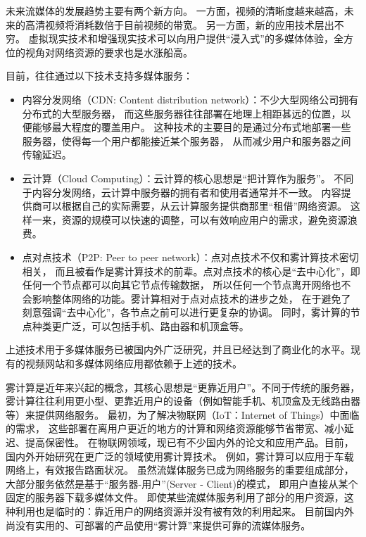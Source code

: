 未来流媒体的发展趋势主要有两个新方向。
一方面，视频的清晰度越来越高，未来的高清视频将消耗数倍于目前视频的带宽。
另一方面，新的应用技术层出不穷。
虚拟现实技术和增强现实技术可以向用户提供“浸入式”的多媒体体验，全方位的视角对网络资源的要求也是水涨船高。

目前，往往通过以下技术支持多媒体服务：
\begin{itemize}
\item 内容分发网络（CDN: Content distribution network）：不少大型网络公司拥有分布式的大型服务器，
而这些服务器往往部署在地理上相距甚远的位置，以便能够最大程度的覆盖用户。
这种技术的主要目的是通过分布式地部署一些服务器，使得每一个用户都能接近某个服务器，
从而减少用户和服务器之间传输延迟。

\item 云计算（Cloud Computing）：云计算的核心思想是“把计算作为服务”。
不同于内容分发网络，云计算中服务器的拥有者和使用者通常并不一致。
内容提供商可以根据自己的实际需要，从云计算服务提供商那里“租借”网络资源。
这样一来，资源的规模可以快速的调整，可以有效响应用户的需求，避免资源浪费。

\item 点对点技术（P2P: Peer to peer network）：点对点技术不仅和雾计算技术密切相关，
而且被看作是雾计算技术的前辈。点对点技术的核心是“去中心化”，即任何一个节点都可以向其它节点传输数据，
所以任何一个节点离开网络也不会影响整体网络的功能。雾计算相对于点对点技术的进步之处，
在于避免了刻意强调“去中心化”，各节点之前可以进行更复杂的协调。
同时，雾计算的节点种类更广泛，可以包括手机、路由器和机顶盒等。
\end{itemize}

上述技术用于多媒体服务已被国内外广泛研究，并且已经达到了商业化的水平。现有的视频网站和多媒体网络应用都依赖于上述的技术。

雾计算是近年来兴起的概念，其核心思想是“更靠近用户”。不同于传统的服务器，
雾计算往往利用更小型、更靠近用户的设备（例如智能手机、机顶盒及无线路由器等）来提供网络服务。
最初，为了解决物联网（IoT：Internet of Things）中面临的需求，
这些部署在离用户更近的地方的计算和网络资源能够节省带宽、减小延迟、提高保密性。
在物联网领域，现已有不少国内外的论文和应用产品。目前，国内外开始研究在更广泛的领域使用雾计算技术。
例如，雾计算可以应用于车载网络上，有效报告路面状况。
虽然流媒体服务已成为网络服务的重要组成部分，大部分服务依然是基于“服务器-用户”(Server - Client)的模式，
即用户直接从某个固定的服务器下载多媒体文件。
即使某些流媒体服务利用了部分的用户资源，这种利用也是临时的：靠近用户的网络资源并没有被有效的利用起来。
目前国内外尚没有实用的、可部署的产品使用“雾计算”来提供可靠的流媒体服务。

